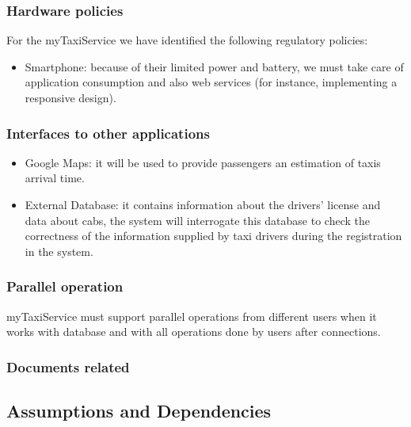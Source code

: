 \documentclass[a4paper,12pt]{article}%
\begin{document}
\subsubsection{Hardware policies}
For the myTaxiService we have identified the following regulatory policies:
\begin{itemize}
\item Smartphone: because of their limited power and battery, we must take care of application consumption and also web services (for instance, implementing a responsive design).
\end{itemize}
\subsubsection{Interfaces to other applications}
\begin{itemize}
\item Google Maps: it will be used to provide passengers an estimation of taxis arrival time.
\item External Database: it contains information about the drivers' license and data about cabs, the system will interrogate this database to check the correctness of the information supplied by taxi drivers during the registration in the system.
\end{itemize} 
\subsubsection{Parallel operation}
myTaxiService must support parallel operations from different users when it works
with database and with all operations done by users after connections.
\subsubsection{Documents related}
\subsection{Assumptions and Dependencies}
\end{document}
